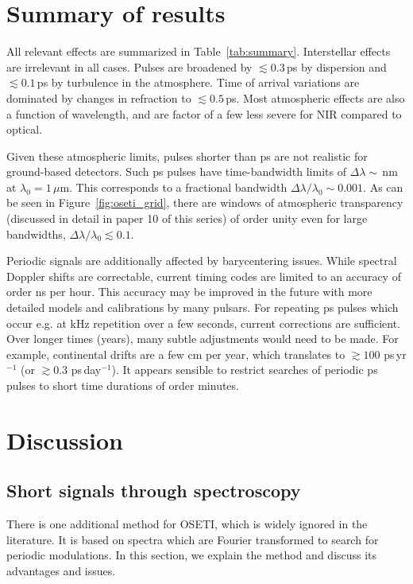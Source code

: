 \documentclass[twocolumn,tighten,longauthor]{myaastex62}
\begin{document}
\section{Summary of results}
All relevant effects are summarized in Table~\ref{tab:summary}. Interstellar effects are irrelevant in all cases. Pulses are broadened by $\lesssim0.3\,$ps by dispersion and $\lesssim0.1\,$ps by turbulence in the atmosphere. Time of arrival variations are dominated by changes in refraction to $\lesssim0.5\,$ps. Most atmospheric effects are also a function of wavelength, and are factor of a few less severe for NIR compared to optical.

Given these atmospheric limits, pulses shorter than ps are not realistic for ground-based detectors. Such ps pulses have time-bandwidth limits of $\Delta \lambda \sim\,$nm at $\lambda_0=1\,\mu$m. This corresponds to a fractional bandwidth $\Delta \lambda / \lambda_0 \sim 0.001$. As can be seen in Figure~\ref{fig:oseti_grid}, there are windows of atmospheric transparency (discussed in detail in paper 10 of this series) of order unity even for large bandwidths, $\Delta \lambda / \lambda_0 \lesssim 0.1$.

Periodic signals are additionally affected by barycentering issues. While spectral Doppler shifts are correctable, current timing codes are limited to an accuracy of order ns per hour. This accuracy may be improved in the future with more detailed models and calibrations by many pulsars. For repeating ps pulses which occur e.g. at kHz repetition over a few seconds, current corrections are sufficient. Over longer times (years), many subtle adjustments would need to be made. For example, continental drifts are a few cm per year, which translates to $\gtrsim 100\,\,$ps\,yr$^{-1}$ (or $\gtrsim 0.3\,\,$ps\,day$^{-1}$). It appears sensible to restrict searches of periodic ps pulses to short time durations of order minutes.


\section{Discussion}

\subsection{Short signals through spectroscopy}
There is one additional method for OSETI, which is widely ignored in the literature. It is based on spectra which are Fourier transformed to search for periodic modulations. In this section, we explain the method and discuss its advantages and issues.
\end{document}
